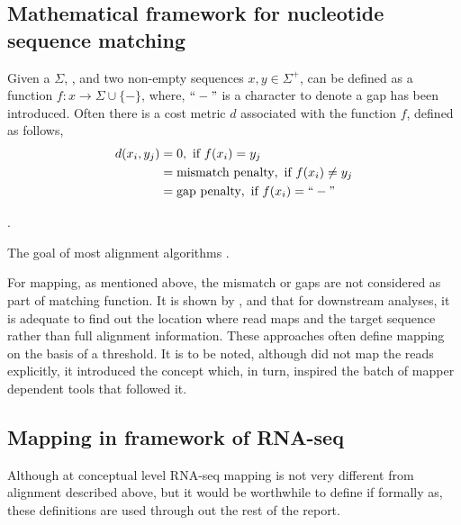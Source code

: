 \subsection{Mathematical framework for nucleotide sequence matching}
Given a  $\Sigma$, , and two non-empty sequences $x,y \in \Sigma^+$,  can be defined as a function $f : x \rightarrow \Sigma \cup \{-\}$, where, $``-"$ is a character to denote a gap has been introduced. Often there is a cost metric $d$ associated with the function $f$, defined as follows, 
\begin{align}
    d(x_i,y_j) &= 0,\text{ if } f(x_i) = y_j \\
    &= \text{mismatch penalty},\text{ if } f(x_i) \neq y_j \\
    &= \text{gap penalty},\text{ if } f(x_i) = ``-" 
\end{align}

.

The goal of most alignment algorithms \citep{Li2010} . 

For mapping, as mentioned above, the mismatch or gaps are not considered as part of matching function. It is shown by \citet{salmon},\citet{kallisto} and \citet{rapmap} that for  downstream analyses, it is adequate to find out the location where read maps and the target sequence rather than full alignment information. These approaches often define mapping on the basis of a threshold. It is to be noted, although \citet{sailfish} did not map the reads explicitly, it introduced the concept  which, in turn, inspired the batch of mapper dependent tools that followed it.

\subsection{Mapping in framework of RNA-seq}
Although at conceptual level RNA-seq mapping is not very different from alignment described above, but it would be worthwhile to define if formally as, these definitions are used through out the rest of the report.

